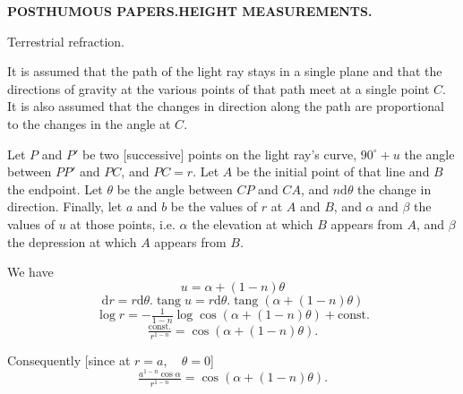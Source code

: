 \par\clearpage
\noindent\null\hfill{\small\textbf{POSTHUMOUS PAPERS.\quad HEIGHT MEASUREMENTS.}}\hfill{}\par
\vspace*{2.4cm}
\begin{center}{\Large\textbf{}}\par\vspace{1.3cm}
Terrestrial refraction.\par\medskip
[1.]
\end{center}
\par\noindent\hspace*{\parindent}It is assumed that the path of the light ray stays in a single plane and that
the directions of gravity at the various points of that path meet at a single
point \(C\). It is also assumed that the changes in direction along the path
are proportional to the changes in the angle at \(C\).
\par\noindent\hspace*{\parindent}Let \(P\) and \(P'\) be two [successive] points on the light ray's curve,
\(90^\circ+u\) the angle between \(PP'\) and \(PC\), and \(PC=r\). Let \(A\) be the
initial point of that line and \(B\) the endpoint. Let \(\theta\) be the angle
between \(CP\) and \(CA\), and \(n\mathrm{d}\theta\) the change in direction.
Finally, let \(a\) and \(b\) be the values of \(r\) at \(A\) and \(B\), and
\(\alpha\) and \(\beta\) the values of \(u\) at those points, i.e. \(\alpha\) the
elevation at which \(B\) appears from \(A\), and \(\beta\) the depression at
which \(A\) appears from \(B\).
\par\noindent\hspace*{\parindent}We have
\[u=\alpha+(1-n)\theta\]
\[\mathrm{d}r=r\mathrm{d}\theta.\operatorname{tang}u=r\mathrm{d}\theta.\operatorname{tang}(\alpha+(1-n)\theta)\]
\noindent [or]
\[\log r=-\tfrac{1}{1-n}\log\cos(\alpha+(1-n)\theta)+\mathrm{const.}\]
\[\tfrac{\mathrm{const.}}{r^{1-n}}=\cos(\alpha+(1-n)\theta).\]
\par\noindent\hspace*{\parindent}Consequently [since at \(r=a,\quad\theta=0\)]
\[\tfrac{a^{1-n}\cos\alpha}{r^{1-n}}=\cos(\alpha+(1-n)\theta).\]

